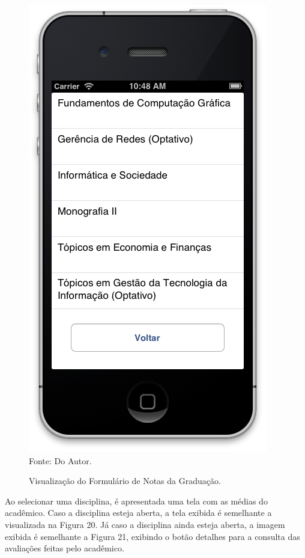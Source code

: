 \begin{figure}[!htb]
     \centering
     \caption[Formulário Notas da Graduação - Lista das Disciplinas]{Visualização do Formulário de Notas da Graduação.}
     \includegraphics[scale=0.34]{imagens/formnotasgraduacao.png}
     \\  Fonte: Do Autor.
\end{figure}
\newpage

Ao selecionar uma disciplina, é apresentada uma tela com as médias do acadêmico. Caso a disciplina esteja aberta, a tela exibida é semelhante a visualizada na Figura 20. Já caso a disciplina ainda esteja aberta, a imagem exibida é semelhante a Figura 21, exibindo o botão detalhes para a consulta das avaliações feitas pelo acadêmico.

